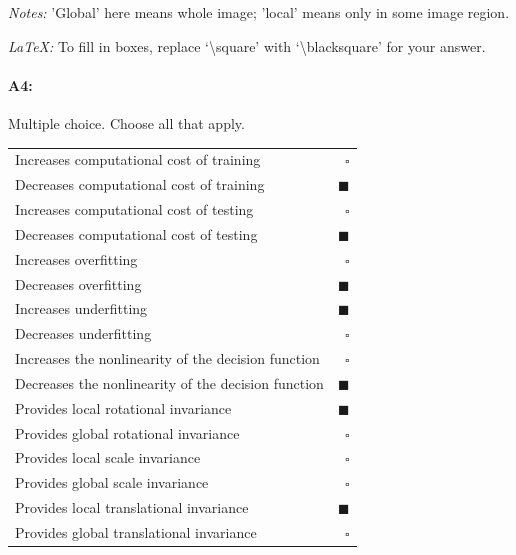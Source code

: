 \emph{Notes:} 'Global' here means whole image; 'local' means only in some image region.

\emph{LaTeX:} To fill in boxes, replace `\textbackslash square' with `\textbackslash blacksquare' for your answer.

\paragraph{A4:} Multiple choice. Choose all that apply.

\begin{tabular}[h]{lr}
    \toprule
    Increases computational cost of training            & $\square$      \\
    Decreases computational cost of training            & $\blacksquare$ \\
    Increases computational cost of testing             & $\square$      \\
    Decreases computational cost of testing             & $\blacksquare$ \\
    \midrule
    Increases overfitting                               & $\square$      \\
    Decreases overfitting                               & $\blacksquare$ \\
    Increases underfitting                              & $\blacksquare$ \\
    Decreases underfitting                              & $\square$      \\
    \midrule
    Increases the nonlinearity of the decision function & $\square$      \\
    Decreases the nonlinearity of the decision function & $\blacksquare$ \\
    \midrule
    Provides local rotational invariance                & $\blacksquare$ \\
    Provides global rotational invariance               & $\square$      \\
    Provides local scale invariance                     & $\square$      \\
    Provides global scale invariance                    & $\square$      \\
    Provides local translational invariance             & $\blacksquare$ \\
    Provides global translational invariance            & $\square$      \\
    \bottomrule
\end{tabular}


